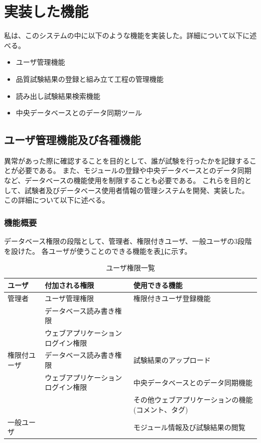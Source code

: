 \section{実装した機能}
私は、このシステムの中に以下のような機能を実装した。詳細について以下に述べる。
\begin{itemize}
  \item ユーザ管理機能
  \item 品質試験結果の登録と組み立て工程の管理機能
  \item 読み出し試験結果検索機能
  \item 中央データベースとのデータ同期ツール
\end{itemize}

\subsection{ユーザ管理機能及び各種機能}

異常があった際に確認することを目的として、誰が試験を行ったかを記録することが必要である。
また、モジュールの登録や中央データベースとのデータ同期など、データベースの機能使用を制限することも必要である。
これらを目的として、試験者及びデータベース使用者情報の管理システムを開発、実装した。
この詳細について以下に述べる。

\subsubsection{機能概要}
データベース権限の段階として、管理者、権限付きユーザ、一般ユーザの3段階を設けた。
各ユーザが使うことのできる機能を表\ref{user_functions_summary}に示す。

\begin{table}[tbp]
\begin{center}
\caption[ユーザ権限一覧]{ユーザ権限一覧}
\label{user_functions_summary}
  \begin{tabular}{|lll|} \hline
    ユーザ       & 付加される権限                               & 使用できる機能 \\ \hline
    管理者       & ユーザ管理権限                     & 権限付きユーザ登録機能\\ 
                 & データベース読み書き権限           & \\ 
                 & ウェブアプリケーションログイン権限 & \\ \hline
    権限付ユーザ & データベース読み書き権限           & 試験結果のアップロード\\ 
                 & ウェブアプリケーションログイン権限 & 中央データベースとのデータ同期機能\\ 
                 &                                    & その他ウェブアプリケーションの機能(コメント、タグ)\\ \hline
    一般ユーザ   &                                    & モジュール情報及び試験結果の閲覧　\\ \hline
  \end{tabular}
\end{center}
\end{table}

